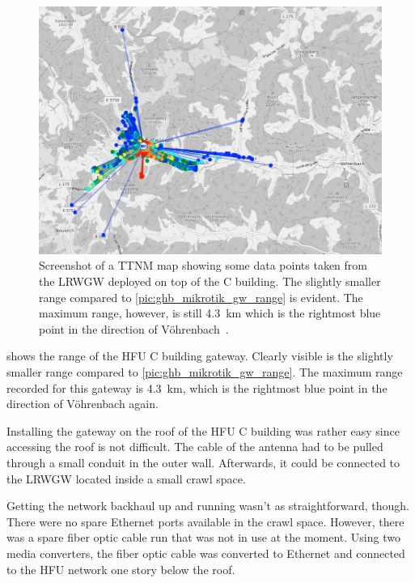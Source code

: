 \begin{figure}[htbp]
    \centering
    \includegraphics[width=1\textwidth]{pictures/ttn-mapper/gateway-ranges/c_building_gw_range.png}
    \caption{
        Screenshot of a \ac{TTNM} map showing some data points taken from the \acl{LRWGW} deployed on top of the C building.
        The slightly smaller range compared to \cref{pic:ghb_mikrotik_gw_range} is evident.
        The maximum range, however, is still \SI{4.3}{\kilo\meter} which is the rightmost blue point in the direction of Vöhrenbach~\cite{ttn_mapper_ttn_2023}.
    }\label{pic:c_building_gw_range}
\end{figure}

 shows the range of the \ac{HFU} C building gateway.
Clearly visible is the slightly smaller range compared to \cref{pic:ghb_mikrotik_gw_range}.
The maximum range recorded for this gateway is \SI{4.3}{\kilo\meter}, which is the rightmost blue point in the direction of Vöhrenbach again.

Installing the gateway on the roof of the \ac{HFU} C building was rather easy since accessing the roof is not difficult.
The cable of the antenna had to be pulled through a small conduit in the outer wall.
Afterwards, it could be connected to the \acl{LRWGW} located inside a small crawl space.

Getting the network backhaul up and running wasn't as straightforward, though.
There were no spare Ethernet ports available in the crawl space.
However, there was a spare fiber optic cable run that was not in use at the moment.
Using two media converters, the fiber optic cable was converted to Ethernet and connected to the \ac{HFU} network one story below the roof.

